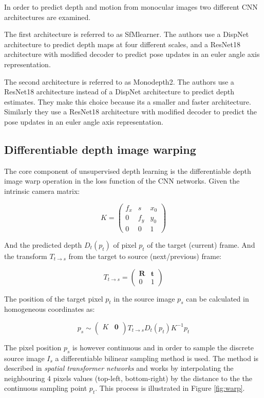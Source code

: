 In order to predict depth and motion from monocular images two different CNN architectures are examined.

The first architecture is referred to as SfMlearner\cite{sfmlearner}. The authors use a DispNet\cite{dispnet} architecture to predict depth maps at four different scales, and a ResNet18\cite{resnet} architecture with modified decoder to predict pose updates in an euler angle axis representation.

The second architecture is referred to as Monodepth2\cite{monodepth2}. The authors use a ResNet18 architecture instead of a DispNet architecture to predict depth estimates. They make this choice because its a smaller and faster architecture. Similarly they use a ResNet18 architecture with modified decoder to predict the pose updates in an euler angle axis representation.

\subsection{Differentiable depth image warping}
\label{sec:diffwarp}

The core component of unsupervised depth learning is the differentiable depth image warp operation in the loss function of the CNN networks. Given the intrinsic camera matrix:

\[
K = 
\begin{pmatrix}
f_x & s & x_0 \\
0 & f_y & y_0 \\
0 & 0   & 1
\end{pmatrix}
\]

And the predicted depth $ D_t(p_t) $ of pixel $ p_t $ of the target (current) frame. And the transform $ T_{t \rightarrow s} $ from the target to source (next/previous) frame:

\[
T_{t \rightarrow s} =
\begin{pmatrix}
\textbf{R} & \textbf{t} \\
0 & 1
\end{pmatrix}
\]

The position of the target pixel $ p_t $ in the source image $ p_s $ can be calculated in homogeneous coordinates as:

\[
p_s \sim 
\begin{pmatrix}
K  & \textbf{0} \\
\end{pmatrix}
T_{t \rightarrow s} D_t(p_t) K^{-1} p_t 
\]

The pixel position $ p_s $ is however continuous and in order to sample the discrete source image $ I_s $ a differentiable bilinear sampling method is used. The method is described in \textit{spatial transformer networks}\cite{spatialtransformernetworks} and works by interpolating the neighbouring 4 pixels values (top-left, bottom-right) by the distance to the the continuous sampling point $ p_t $. This process is illustrated in Figure \ref{fig:warp}.


